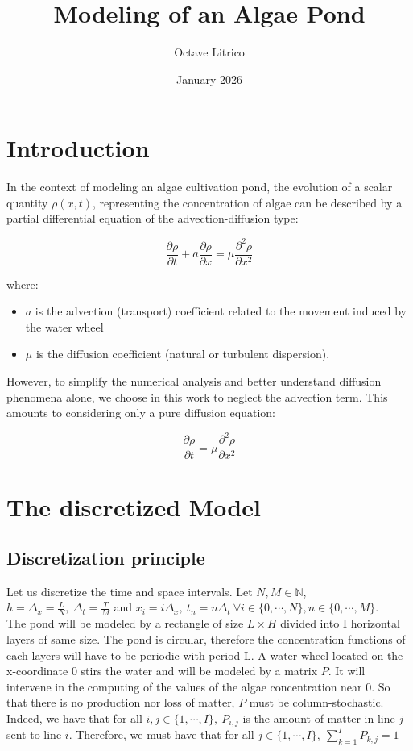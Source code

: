 \documentclass{article}
\title{Modeling of an Algae Pond}
\author{Octave Litrico}
\date{January 2026}
\begin{document}
\maketitle

\section*{Introduction}

In the context of modeling an algae cultivation pond, the evolution of a scalar quantity \( \rho(x,t) \), representing the concentration of algae can be described by a partial differential equation of the advection-diffusion type:

\[
\frac{\partial \rho}{\partial t} + a \frac{\partial \rho}{\partial x} = \mu\frac{\partial^2 \rho}{\partial x^2}
\]

where:
\begin{itemize}
  \item \( a \) is the advection (transport) coefficient related to the movement induced by the water wheel
  \item \( \mu \) is the diffusion coefficient (natural or turbulent dispersion).
\end{itemize}

However, to simplify the numerical analysis and better understand diffusion phenomena alone, we choose in this work to neglect the advection term. This amounts to considering only a pure diffusion equation:

\[
\frac{\partial \rho}{\partial t} = \mu\frac{\partial^2 \rho}{\partial x^2}
\]

\section{The discretized Model}

\subsection{Discretization principle}

Let us discretize the time and space intervals. Let $N, M \in \mathbb{N}$, $h = \Delta_x = \frac{L}{N}, \ \Delta_t = \frac{T}{M}$ and $x_i = i\Delta_x, \ t_n=n\Delta_t \ \forall i \in \{0, \cdots, N\}, n\in \{0, \cdots, M\}$. \\

The pond will be modeled by a rectangle of size $L\times H$ divided into I horizontal layers of same size. The pond is circular, therefore the concentration functions of each layers will have to be periodic with period L. A water wheel located on the x-coordinate $0$ stirs the water and will be modeled by a matrix $P$. It will intervene in the computing of the values of the algae concentration near $0$. So that there is no production nor loss of matter, $P$ must be column-stochastic. Indeed, we have that for all $i, j \in \{1, \cdots, I\}, \ P_{i, j}$ is the amount of matter in line $j$ sent to line $i$. Therefore, we must have that for all $j \in \{1, \cdots, I\}, \ \sum_{k=1}^IP_{k, j} = 1$\\
\end{document}
